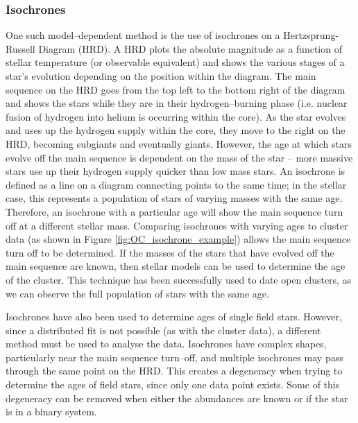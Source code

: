 \subsubsection{Isochrones}
One such model--dependent method is the use of isochrones on a Hertzsprung-Russell Diagram (HRD). A HRD plots the absolute magnitude as a function of stellar temperature (or observable equivalent) and shows the various stages of a star's evolution depending on the position within the diagram. The main sequence on the HRD goes from the top left to the bottom right of the diagram and shows the stars while they are in their hydrogen--burning phase (i.e. nuclear fusion of hydrogen into helium is occurring within the core). As the star evolves and uses up the hydrogen supply within the core, they move to the right on the HRD, becoming subgiants and eventually giants. However, the age at which stars evolve off the main sequence is dependent on the mass of the star -- more massive stars use up their hydrogen supply quicker than low mass stars. An isochrone is defined as a line on a diagram connecting points to the same time; in the stellar case, this represents a population of stars of varying masses with the same age. Therefore, an isochrone with a particular age will show the main sequence turn off at a different stellar mass. Comparing isochrones with varying ages to cluster data (as shown in Figure \ref{fig:OC_isochrone_example}) allows the main sequence turn off to be determined. If the masses of the stars that have evolved off the main sequence are known, then stellar models can be used to determine the age of the cluster. This technique has been successfully used to date open clusters, as we can observe the full population of stars with the same age.

Isochrones have also been used to determine ages of single field stars. However, since a distributed fit is not possible (as with the cluster data), a different method must be used to analyse the data. Isochrones have complex shapes, particularly near the main sequence turn--off, and multiple isochrones may pass through the same point on the HRD. This creates a degeneracy when trying to determine the ages of field stars, since only one data point exists. Some of this degeneracy can be removed when either the abundances are known or if the star is in a binary system.

